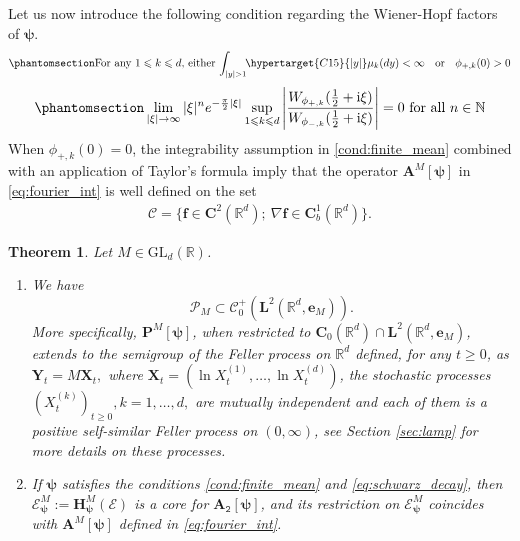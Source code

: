 \documentclass[12pt]{amsart}
\newcommand{\hlabel}{\phantomsection\label}
\newcommand{\hptg}[2]{\hypertarget{#1}{#2}}
\numberwithin{equation}{section}
\newcommand{\bb}{\mathbb}
\newcommand{\cc}{\mathcal}
\newcommand{\ccP}{\mathscr{P}}
\renewcommand{\le}{\leqslant}
\renewcommand{\geq}{\geqslant}
\newcommand{\nab}{\nabla}
\newcommand{\ttt}{\mathtt}
\newcommand{\bmrm}[2][2]{\mathbf{#2}^{#1}}
\newcommand{\FsemiM}{\bm{P}^M[\bm{\psi}]}
\newcommand{\AM}{\bm{A}^M}
\newcommand{\C}{\mathbf{C}}
\renewcommand{\i}{\mathrm{i}}
\newcommand{\f}{\mathbf{f}}
\newtheorem{thm}{Theorem}[section]
\theoremstyle{definition}
\theoremstyle{assump}
\theoremstyle{remark}
\begin{document}
%
Let us now introduce the following condition regarding the Wiener-Hopf factors of $\bm{\psi}$.
\begin{equation}\hlabel{cond:finite_mean}
	\textrm{For any $1\le k\le d$, either $\int_{|y|> 1}\!\!\hptg{C15}{|y|}\mu_k(dy)<\infty$ \; or \; $\phi_{+,k}(0)>0$}
\end{equation}
\begin{equation}\hlabel{eq:schwarz_decay}
	\lim_{|\xi|\to\infty}|\xi|^ne^{-\frac{\pi}{2}|\xi|}\sup_{1\le k\le d}\left|\frac{W_{\phi_{+,k}}(\frac{1}{2}+\i\xi)}{W_{\phi_{-,k}}(\frac{1}{2}+\i\xi)}\right|=0 \ \textrm{for all $n\in\bb N$}
\end{equation}
When $\phi_{+,k}(0)=0$, the integrability assumption in \eqref{cond:finite_mean} combined with an application of Taylor's formula imply that the operator $\AM[\bm\psi]$ in \eqref{eq:fourier_int} is well defined on the set
\begin{align}
	\bm{\cc{C}}=\{\f\in \C^2(\bb{R}^d); \: \nab\f\in \C^1_b(\bb{R}^d)\}.
\end{align}
\begin{thm}\hlabel{thm:core_multi_d}
Let $M\in\mathrm{GL}_d(\bb R)$.
\begin{enumerate}
\item\hlabel{it:feller_semigroup} We have \[ \ccP_M \subset \mathcal{C}^+_0(\bmrm{L}(\bb{R}^d,{\mathbf{e}}_M)).\] More specifically, $\FsemiM$,  when restricted to $\C_0(\bb{R}^d) \cap \bmrm{L}(\bb{R}^d,{\mathbf{e}}_M)$, extends to the semigroup of the Feller process on $\bb{R}^d$ defined, for any $t\geq0$, as $\bm{Y}_t = M \bm{X}_t,$ where $\bm{X}_t=(\ln X^{(1)}_t, \ldots,\ln X^{(d)}_t)$, the stochastic processes $(X^{(k)}_t)_{t\geq0}, k=1,\ldots,d,$ are mutually independent  and each of them is a positive self-similar  Feller process on $(0,\infty)$, see Section \ref{sec:lamp} for more details on these processes.
	\item\hlabel{it:core} If $\bm{\psi}$ satisfies the conditions \eqref{cond:finite_mean} and \eqref{eq:schwarz_decay}, then $\bm{\cc{E}}^M_{\bm \psi}:=\bm{H}^M_{\bm\psi}(\bm{\cc{E}})$ is a core for $\bm{A}_{\ttt 2}[\bm \psi]$, and its restriction on $\bm{\cc{E}}^M_{\bm \psi}$  coincides with $\bm{A}^M[\bm\psi]$ defined in \eqref{eq:fourier_int}.
\end{enumerate}
\end{thm}
\end{document}
